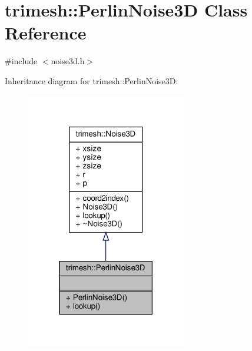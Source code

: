 \hypertarget{classtrimesh_1_1PerlinNoise3D}{}\section{trimesh\+:\+:Perlin\+Noise3D Class Reference}
\label{classtrimesh_1_1PerlinNoise3D}


{\ttfamily \#include $<$noise3d.\+h$>$}



Inheritance diagram for trimesh\+:\+:Perlin\+Noise3D\+:\nopagebreak
\begin{figure}[H]
\begin{center}
\leavevmode
\includegraphics[width=198pt]{db/dae/classtrimesh_1_1PerlinNoise3D__inherit__graph}
\end{center}
\end{figure}


